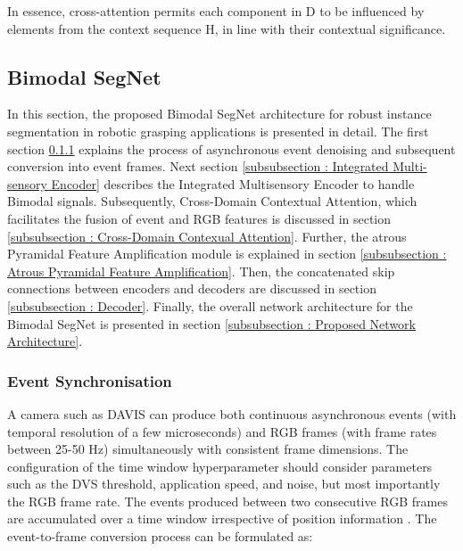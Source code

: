 \documentclass[lettersize,journal]{IEEEtran}
\begin{document}
In essence, cross-attention permits each component in D to be influenced by elements from the context sequence H, in line with their contextual significance.
 








\subsection{\textbf{Bimodal SegNet}}

In this section, the proposed Bimodal SegNet architecture for robust instance segmentation in robotic grasping applications is presented in detail. The first section \ref{subsubsection : Event Synchronisation} explains the process of asynchronous event denoising and subsequent conversion into event frames. Next section \ref{subsubsection : Integrated Multi-sensory Encoder}  describes the Integrated Multisensory Encoder to handle Bimodal signals. Subsequently, Cross-Domain Contextual Attention, which facilitates the fusion of event and RGB features is discussed in section \ref{subsubsection : Cross-Domain Contexual Attention}. Further, the atrous Pyramidal Feature Amplification module is explained in section \ref{subsubsection : Atrous Pyramidal Feature Amplification}. Then, the concatenated skip connections between encoders and decoders are discussed in section \ref{subsubsection : Decoder}. Finally, the overall network architecture for the Bimodal SegNet is presented in section \ref{subsubsection : Proposed Network Architecture}. 



\subsubsection{\textbf{Event Synchronisation}}
\label{subsubsection : Event Synchronisation}

A camera such as DAVIS can produce both continuous asynchronous events  (with temporal resolution of a few microseconds) and RGB frames (with frame rates between 25-50 Hz) simultaneously with consistent frame dimensions.
The configuration of the time window  hyperparameter should consider parameters such as the DVS threshold, application speed, and noise, but most importantly the RGB frame rate. The events produced between two consecutive RGB frames are accumulated over a time window  irrespective of position information \cite{Naeini2020Dynamic-vision-basedNetworks}. The event-to-frame conversion process can be formulated as: 
\end{document}
